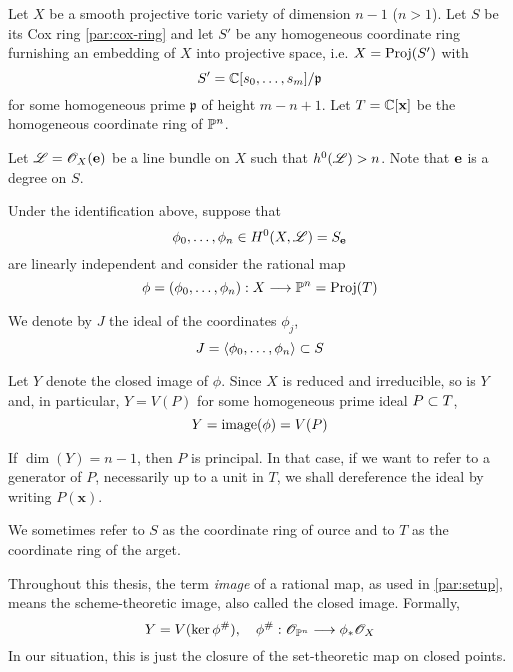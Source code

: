 \documentclass[fleqn,reqno]{amsart}
\begin{document}
\begin{paragraf}
\label{par:setup}
Let $X$ be a smooth projective toric variety of dimension $n-1$ ($n>1$).
Let $S$ be its Cox ring \eqref{par:cox-ring} and
let $S'$ be any homogeneous coordinate ring
furnishing an embedding of $X$ into projective space, i.e. $X=\operatorname{Proj}(S')$ with
\[
	S'=\mathbb{C}[s_0,\ldots,s_m]/\mathfrak{p}
\]
for some homogeneous prime $\mathfrak{p}$ of height $m-n+1$.
Let $T=\mathbb{C}[\mathbf x]$ be the homogeneous coordinate ring of $\mathbb{P}^n$.

Let $\mathscr{L}=\mathscr{O}_X(\mathbf e)$ be a line bundle on $X$ such that $h^0(\mathscr{L})> n$.
Note that $\mathbf e$ is a degree on $S$.

Under the identification above, suppose that
\[
\phi_0,\ldots,\phi_n\in H^0(X,\mathscr{L})=S_{\mathbf e}
\]
are linearly independent and consider the rational map
\[
	\phi=(\phi_0,\ldots,\phi_n):X\longrightarrow\mathbb{P}^n=\operatorname{Proj}(T)
\]

We denote by $J$ the ideal of the coordinates $\phi_j$,
\[
	J=\langle\phi_0,\ldots,\phi_n\rangle\subset S
\]

Let $Y$ denote the closed image of $\phi$.
Since $X$ is reduced and irreducible, so is $Y$ and, in particular,
$Y=V(P)$ for some homogeneous prime ideal $P\subset T$,
\[
	Y=\operatorname{image}(\phi)=V(P)
\]

If $\dim(Y)=n-1$, then $P$ is principal.
In that case,
if we want to refer to a generator of $P$, necessarily up to a unit in $T$,
we shall dereference the ideal by writing $P(\mathbf x)$.

We sometimes refer to $S$ as the coordinate ring of ource and
to $T$ as the coordinate ring of the arget.
\end{paragraf}

\begin{paragraf}
Throughout this thesis, the term {\em image} of a rational map, as used in \eqref{par:setup},
means the scheme-theoretic image, also called the closed image. Formally,
\[
	Y = V(\ker\phi^\#),\quad \phi^\#:\mathscr{O}_{\mathbb{P}^n}\longrightarrow\phi_\ast\mathscr{O}_X
\]
In our situation, this is just the closure of the set-theoretic map on closed points.
\end{paragraf}
\end{document}
